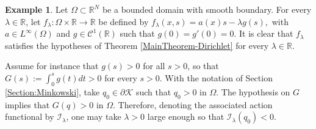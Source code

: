 \documentclass{article}
\newcommand{\boC}{\mathcal{C}}
\newcommand{\boK}{\mathcal{K}}
\newcommand{\boI}{\mathcal{I}}
\newcommand{\R}{\mathbb{R}}
\theoremstyle{definition}
\newtheorem{example}{Example}[section]
\begin{document}
\begin{example}
Let $\Omega\subset\R^N$ be a bounded domain with smooth boundary. For every $\lambda\in\R$, let  $f_\lambda:\Omega\times\R\to\R$ be defined by $f_\lambda(x,s)=a(x)s-\lambda g(s),$ with $a\in L^\infty(\Omega)$ and $g\in\boC^1(\R)$ such that $g(0)=g'(0)=0$. It is clear that $f_\lambda$
satisfies the hypotheses of Theorem \ref{MainTheorem-Dirichlet} for every $\lambda\in\R$.

Assume for instance that $g(s)>0$ for all $s>0$, so that $G(s):=\int_0^sg(t)dt>0$ for every $s>0$. With the notation of Section \ref{Section:Minkowski},  take  $q_0\in\partial\boK$ such that $q_0>0$ in $\Omega$. The hypothesis on $G$ implies that $G(q)>0$ in $\Omega$. Therefore, denoting the associated action functional by $\boI_\lambda$, one may take $\lambda>0$ large enough so that $\boI_\lambda(q_0)<0$. 
\end{example} 
\end{document}
